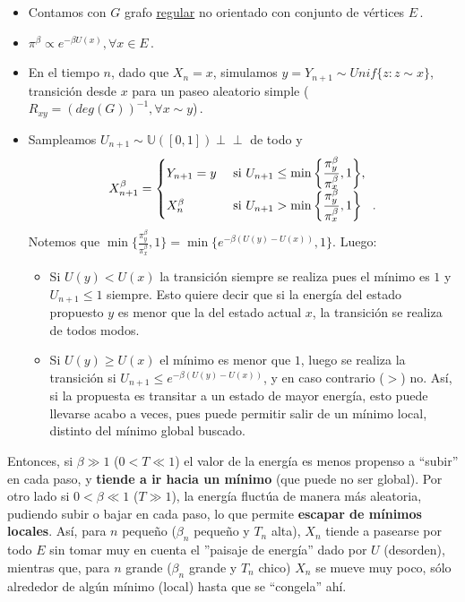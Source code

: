 \documentclass[letterpaper,11pt]{article} %
\def\espacio{\hspace{.25cm}\,}
\theoremstyle{defbreak}
\theoremstyle{propbreak}
\theoremstyle{remark}
\theoremstyle{break}
\def\unif{\mathbb{U}([0,1])}
\newcommand{\indep}{\perp \!\!\! \perp}
\begin{document}
\begin{itemize}
    \item Contamos con $G$ grafo \underline{regular} no orientado con conjunto de v\'ertices $E$\,.
    \item $\pi^\beta \propto e^{-\beta U(x)}, \forall x \in E$\,.
    \item En el tiempo $n$, dado que $X_n=x$, simulamos
    $ y=Y_{n+1}\sim Unif\{z:z\sim x\}$, transición desde $x$ para un paseo aleatorio simple ($R_{xy}=(deg(G))^{-1}, \forall x\sim y$)\,.
    \item Sampleamos $U_{n+1}\sim\unif \indep$ de todo y 
    $$ X_{n+1}^\beta =\begin{cases}
    Y_{n+1}=y  & \mbox{ si } U_{n+1}\leq\displaystyle\min\bigg\{\displaystyle\frac{\pi_y^\beta}{\pi_x^\beta},1\bigg\} , \\
    X_n^\beta  & \mbox{ si } U_{n+1}>\min\bigg\{\displaystyle\frac{\pi_y^\beta}{\pi_x^\beta},1\bigg\}\espacio.
    \end{cases}$$
    Notemos que  $\min\bigg\{\displaystyle\frac{\pi_y^\beta}{\pi_x^\beta},1\bigg\} = \min \{ e^{-\beta(U(y)-U(x))},1\}$. Luego: 
    \begin{itemize}
        \item Si $U(y)<U(x)$ la transición siempre se realiza pues  el m\'inimo es $1$ y $U_{n+1}\leq 1$ siempre. Esto quiere decir que si la energía del estado propuesto $y$ es menor que la del estado actual $x$, la transición se realiza de todos modos.
        \item Si $U(y)\geq U(x)$  el m\'inimo es menor que $1$, luego se realiza la transici\'on si  $U_{n+1}\leq e^{-\beta(U(y)-U(x))}$, y en caso contrario ($>$) no. As\'i, si la propuesta es transitar a un estado de mayor energía, esto puede llevarse acabo a veces,  pues puede permitir salir de un mínimo local, distinto del mínimo  global buscado.
    \end{itemize}
\end{itemize}
Entonces,  si $\beta\gg 1 $ ($0<T\ll  1 $) el valor de la energ\'ia es menos propenso a ``subir'' en cada paso, y \textbf{tiende a ir hacia un m\'inimo}  (que puede no ser global). Por otro lado si $0<\beta\ll  1$ ($T\gg 1$),  la energ\'ia fluct\'ua de manera más aleatoria, pudiendo  subir o bajar en cada paso, lo que permite \textbf{escapar de mínimos locales}.
\newp Así, para $n$ pequeño ($\beta_n$ pequeño y $T_n$ alta), $X_n$ tiende a pasearse por todo $E$ sin tomar muy en cuenta el ''paisaje de energ\'ia'' dado por $U$ (desorden), mientras que, para $n$ grande ($\beta_n$ grande y $T_n$ chico) $X_n$ se mueve muy poco, sólo alrededor de algún mínimo (local) hasta que se ``congela'' ahí. 
\end{document}

